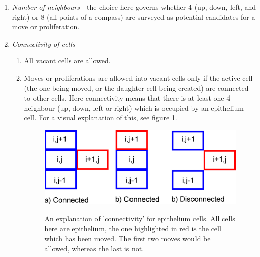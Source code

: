 \documentclass[pdftex,10pt,a4paper]{article}
\begin{document}
\begin{enumerate}
\item \textit{Number of neighbours} - the choice here governs whether 4 (up, down, left, and right) or 8 (all points of a compass) are surveyed as potential candidates for a move or proliferation.
\item \textit{Connectivity of cells}
\begin{enumerate}
\item All vacant cells are allowed.
\item Moves or proliferations are allowed into vacant cells only if the active cell (the one being moved, or the daughter cell being created) are connected to other cells. Here connectivity means that there is at least one 4-neighbour (up, down, left or right) which is occupied by an epithelium cell. For a visual explanation of this, see figure \ref{fig:connected}. \label{item:sticky1}

\begin{figure}[t] 
\centering
\scalebox{0.5} 
{\includegraphics{connected.eps}}
\caption{An explanation of 'connectivity' for epithelium cells. All cells here are epithelium, the one highlighted in red is the cell which has been moved. The first two moves would be allowed, whereas the last is not.}\label{fig:connected}
\end{figure} 



\end{enumerate}
\end{enumerate}
\end{document}

